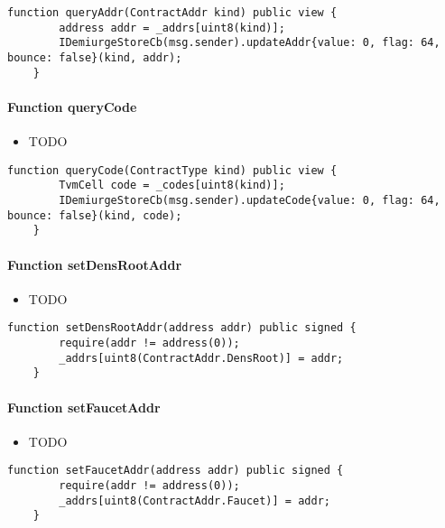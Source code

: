 \begin{lstlisting}[firstnumber=43]
    function queryAddr(ContractAddr kind) public view {
        address addr = _addrs[uint8(kind)];
        IDemiurgeStoreCb(msg.sender).updateAddr{value: 0, flag: 64, bounce: false}(kind, addr);
    }
\end{lstlisting}

\paragraph{Function queryCode}

\begin{itemize}
\item TODO
\end{itemize}

\begin{lstlisting}[firstnumber=38]
    function queryCode(ContractType kind) public view {
        TvmCell code = _codes[uint8(kind)];
        IDemiurgeStoreCb(msg.sender).updateCode{value: 0, flag: 64, bounce: false}(kind, code);
    }
\end{lstlisting}

\paragraph{Function setDensRootAddr}

\begin{itemize}
\item TODO
\end{itemize}

\begin{lstlisting}[firstnumber=21]
    function setDensRootAddr(address addr) public signed {
        require(addr != address(0));
        _addrs[uint8(ContractAddr.DensRoot)] = addr;
    }
\end{lstlisting}

\paragraph{Function setFaucetAddr}

\begin{itemize}
\item TODO
\end{itemize}

\begin{lstlisting}[firstnumber=29]
    function setFaucetAddr(address addr) public signed {
        require(addr != address(0));
        _addrs[uint8(ContractAddr.Faucet)] = addr;
    }
\end{lstlisting}

